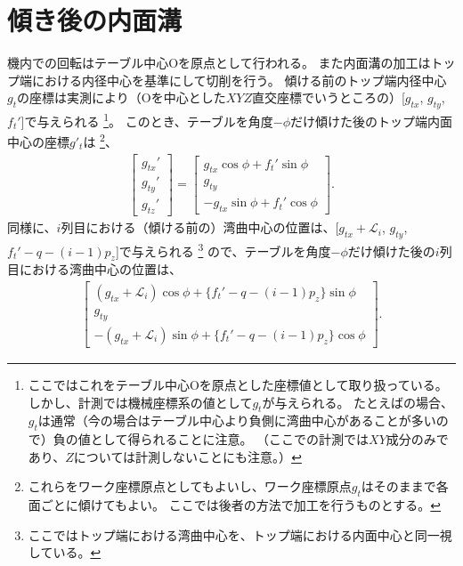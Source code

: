 \section{傾き後の内面溝}
機内での回転はテーブル中心Oを原点として行われる。
また内面溝の加工はトップ端における内径中心を基準にして切削を行う。
傾ける前のトップ端内径中心$g_t$の座標は実測により（Oを中心とした$XYZ$直交座標でいうところの）[$g_{tx}$, $g_{ty}$, $f_t'$]で与えられる
\footnote{ここではこれをテーブル中心Oを原点とした座標値として取り扱っている。
しかし、計測では機械座標系の値として$g_t$が与えられる。
たとえば\DMname の場合、$g_t$は通常（今の場合はテーブル中心より負側に湾曲中心があることが多いので）負の値として得られることに注意。
（ここでの計測では$XY$成分のみであり、$Z$については計測しないことにも注意。）}。
このとき、テーブルを角度$-\phi$だけ傾けた後のトップ端内面中心の座標$g'_t$は
\footnote{これらをワーク座標原点としてもよいし、ワーク座標原点$g_t$はそのままで各面ごとに傾けてもよい。
ここでは後者の方法で加工を行うものとする。}、
\begin{align}
  \label{eq:afterPhiTCenterFromO}
  \left[
  \begin{array}{c}
    g_{tx}'\\
    g_{ty}'\\
    g_{tz}'
  \end{array}
  \right]
  =\left[
   \begin{array}{c}
     g_{tx}\cos\phi+f_t'\sin\phi\\
     g_{ty}\\
     -g_{tx}\sin\phi+f_t'\cos\phi
   \end{array}
   \right].
   \end{align}
同様に、$i$列目における（傾ける前の）湾曲中心の位置は、[$g_{tx}+\mathcal L_i$, $g_{ty}$, $f_t'-q-(i-1)p_z$]で与えられる
\footnote{ここではトップ端における湾曲中心を、トップ端における内面中心と同一視している。}
ので、テーブルを角度$-\phi$だけ傾けた後の$i$列目における湾曲中心の位置は、
\begin{align*}
  \left[
  \begin{array}{c}
    (g_{tx}+\mathcal L_i)\cos\phi+\{f_t'-q-(i-1)p_z\}\sin\phi\\
    g_{ty}\\
    -(g_{tx}+\mathcal L_i)\sin\phi+\{f_t'-q-(i-1)p_z\}\cos\phi
  \end{array}
  \right].
\end{align*}
